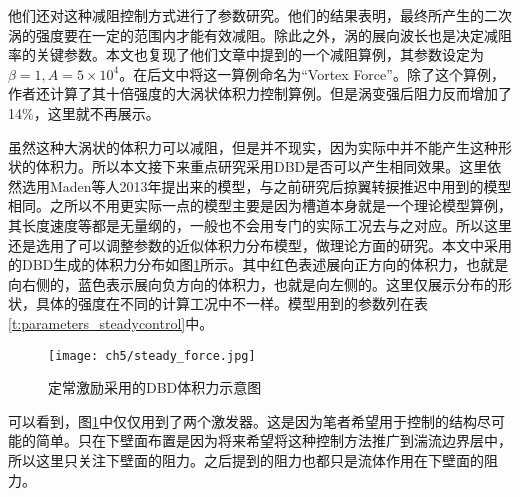 他们还对这种减阻控制方式进行了参数研究。他们的结果表明，最终所产生的二次涡的强度要在一定的范围内才能有效减阻。除此之外，涡的展向波长也是决定减阻率的关键参数。本文也复现了他们文章中提到的一个减阻算例，其参数设定为$\beta=1,A=5\times10^4$。在后文中将这一算例命名为“Vortex Force”。除了这个算例，作者还计算了其十倍强度的大涡状体积力控制算例。但是涡变强后阻力反而增加了14\%，这里就不再展示。

虽然这种大涡状的体积力可以减阻，但是并不现实，因为实际中并不能产生这种形状的体积力。所以本文接下来重点研究采用DBD是否可以产生相同效果。这里依然选用Maden等人2013年提出来的模型，与之前研究后掠翼转捩推迟中用到的模型相同。之所以不用更实际一点的模型主要是因为槽道本身就是一个理论模型算例，其长度速度等都是无量纲的，一般也不会用专门的实际工况去与之对应。所以这里还是选用了可以调整参数的近似体积力分布模型，做理论方面的研究。本文中采用的DBD生成的体积力分布如图\ref{f:steady_force}所示。其中红色表述展向正方向的体积力，也就是向右侧的，蓝色表示展向负方向的体积力，也就是向左侧的。这里仅展示分布的形状，具体的强度在不同的计算工况中不一样。模型用到的参数列在表\ref{t:parameters_steadycontrol}中。
\begin{figure}[htb]
  \centering
  \texttt{[image: ch5/steady\_force.jpg]}
  \caption{定常激励采用的DBD体积力示意图}\label{f:steady_force}
\end{figure}

可以看到，图\ref{f:steady_force}中仅仅用到了两个激发器。这是因为笔者希望用于控制的结构尽可能的简单。只在下壁面布置是因为将来希望将这种控制方法推广到湍流边界层中，所以这里只关注下壁面的阻力。之后提到的阻力也都只是流体作用在下壁面的阻力。

